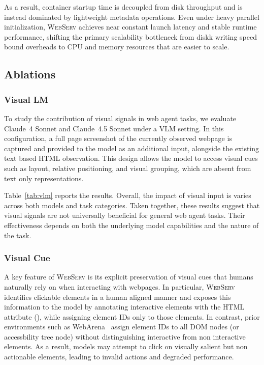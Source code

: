 \documentclass{article}
\DeclareRobustCommand{\projectname}{\textsc{WebServ}\xspace}
\begin{document}
As a result, container startup time is decoupled from disk throughput and is instead dominated by lightweight metadata operations. Even under heavy parallel initialization, \projectname achieves near constant launch latency and stable runtime performance, shifting the primary scalability bottleneck from diskk writing speed bound overheads to CPU and memory resources that are easier to scale.


\subsection{Ablations}

\subsubsection{Visual LM}



To study the contribution of visual signals in web agent tasks, we evaluate Claude~4 Sonnet and Claude~4.5 Sonnet under a VLM setting. In this configuration, a full page screenshot of the currently observed webpage is captured and provided to the model as an additional input, alongside the existing text based HTML observation. This design allows the model to access visual cues such as layout, relative positioning, and visual grouping, which are absent from text only representations.

Table~\ref{tab:vlm} reports the results. Overall, the impact of visual input is varies across both models and task categories.
Taken together, these results suggest that visual signals are not universally beneficial for general web agent tasks.
Their effectiveness depends on both the underlying model capabilities and the nature of the task.


\subsubsection{Visual Cue}

A key feature of \projectname is its explicit preservation of visual cues that humans naturally rely on when interacting with webpages. In particular, \projectname identifies clickable elements in a human aligned manner and exposes this information to the model by annotating interactive elements with the HTML attribute (), while assigning element IDs only to those elements. 
In contrast, prior environments such as WebArena~\cite{zhouWebArenaRealisticWeb2024} assign element IDs to all DOM nodes (or accessbility tree node) without distinguishing interactive from non interactive elements. As a result, models may attempt to click on visually salient but non actionable elements, leading to invalid actions and degraded performance.
\end{document}

